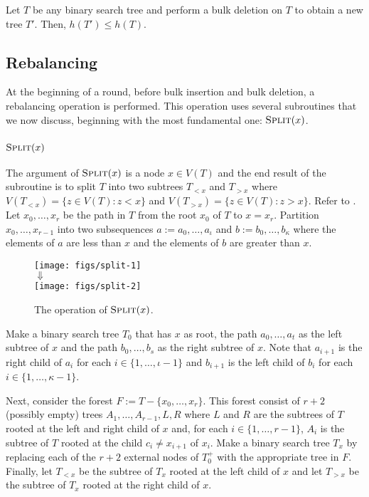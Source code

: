 \documentclass[kpfonts]{patmorin}
\begin{document}
\begin{lem}
  Let $T$ be any binary search tree and perform a bulk deletion on $T$ to obtain a new tree $T'$.  Then, $h(T')\le h(T)$.
\end{lem}


\subsection{Rebalancing}

At the beginning of a round, before bulk insertion and bulk deletion, a rebalancing operation is performed.  This operation uses several subroutines that we now discuss, beginning with the most fundamental one:  $\textsc{Split}(x)$.

\subsubsection{$\textsc{Split}(x)$}

The argument of $\textsc{Split}(x)$ is a node $x\in V(T)$ and the end result of the subroutine is to split $T$ into two subtrees $T_{<x}$ and $T_{>x}$ where $V(T_{<x})=\{z\in V(T): z<x\}$ and $V(T_{>x})=\{z\in V(T): z>x\}$. Refer to .  Let $x_0,\ldots,x_r$ be the path in $T$ from the root $x_0$ of $T$ to $x=x_r$.  Partition $x_0,\ldots,x_{r-1}$ into two subsequences $a:=a_0,\ldots,a_\iota$ and $b:=b_0,\ldots,b_\kappa$ where the elements of $a$ are less than $x$ and the elements of $b$ are greater than $x$.

\begin{figure}
  \begin{center}
    \texttt{[image: figs/split-1]} \\[1ex]
    $\Downarrow$ \\[1ex]
    \texttt{[image: figs/split-2]}
  \end{center}
  \caption{The operation of $\textsc{Split}(x)$.}
\end{figure}

Make a binary search tree $T_0$ that has $x$ as root, the path $a_0,\ldots,a_t$ as the left subtree of $x$ and the path $b_0,\ldots,b_s$ as the right subtree of $x$.  Note that $a_{i+1}$ is the right child of $a_i$ for each $i\in\{1,\ldots,\iota-1\}$ and $b_{i+1}$ is the left child of $b_i$ for each $i\in\{1,\ldots,\kappa-1\}$. 

Next, consider the forest $F:=T-\{x_0,\ldots,x_r\}$. This forest consist of $r+2$ (possibly empty) trees $A_1,\ldots,A_{r-1},L,R$ where $L$ and $R$ are the subtrees of $T$ rooted at the left and right child of $x$ and, for each $i\in\{1,\ldots,r-1\}$, $A_i$ is the subtree of $T$ rooted at the child $c_i\neq x_{i+1}$ of $x_i$.  Make a binary search tree $T_x$ by replacing each of the $r+2$ external nodes of $T_0^+$ with the appropriate tree in $F$.  Finally, let $T_{<x}$ be the subtree of $T_x$ rooted at the left child of $x$ and let $T_{>x}$ be the subtree of $T_x$ rooted at the right child of $x$.
\end{document}
